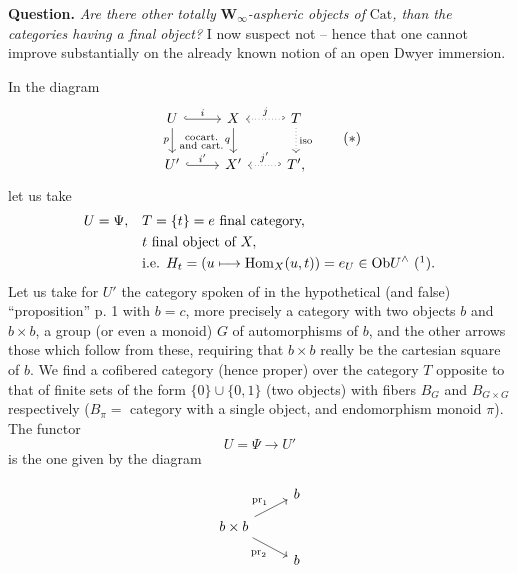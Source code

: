 \documentclass[11pt]{article}
\newcommand{\printedpage}[1]{\marginpar{\footnotesize p.~#1}}
\newcommand{\msp}[1]{\marginpar{\footnotesize [#1]}}
\newcommand{\Hom}{\mathrm{Hom}}
\newcommand{\Ob}{\mathrm{Ob}}
\newcommand{\Cat}{\mathrm{Cat}}
\newcommand{\pr}{\mathrm{pr}}
\begin{document}
\printedpage{4}

\msp{page 5}
\textbf{Question.} \textit{Are there other totally} $\mathbf{W}_\infty$\textit{-aspheric objects of} $\Cat$\textit{, than the categories having a final object?} I now suspect not -- hence that one cannot improve substantially on the already known notion of an open Dwyer immersion.

In the diagram
\[
\begin{tikzcd}
U \arrow[r, hook, "i"] \arrow[d, "p"'] \arrow[dr, phantom, "\substack{\text{cocart.}\\ \text{and cart.}}"] & X \arrow[d, "q"'] & T \arrow[l, hook', dotted, "j"'] \arrow[d, dotted, "\text{iso}"] \\
U' \arrow[r, hook, "i'"] & X' & T', \arrow[l, hook', dotted, "j'"']
\end{tikzcd}
\tag*{$(*)$}
\]
let us take
\[
\begin{aligned}
U = \Psi, \quad & T = \{t\} = e \text{ final category,}\\
& t \text{ final object of } X,\\
& \text{i.e. } H_t = (u\longmapsto \Hom_X(u,t)) = e_U \in \Ob U^\wedge \ \mbox{(\footnotemark)}.
\end{aligned}
\]
Let us take for $U'$ the category spoken of in the hypothetical (and false) ``proposition'' p. 1 with $b = c$, more precisely a category with two objects $b$ and $b\times b$, a group (or even a monoid) $G$ of automorphisms of $b$, and the other arrows those which follow from these, requiring that $b\times b$ really be the cartesian square of $b$. We find a cofibered category (hence proper) over the category $T$ opposite to that of finite sets of the form $\{0\}\cup\{0,1\}$ (two objects) with fibers $B_G$ and $B_{G\times G}$ respectively ($B_\pi =$ category with a single object, and endomorphism monoid $\pi$). The functor
\[
U = \Psi \longrightarrow U'
\]
is the one given by the diagram

\msp{page 6}
\[
\begin{tikzcd}[row sep=small]
& b \\
b\times b \arrow[ur, "\pr_1"] \arrow[dr, "\pr_2"'] & \\
& b
\end{tikzcd}
\]
\end{document}
